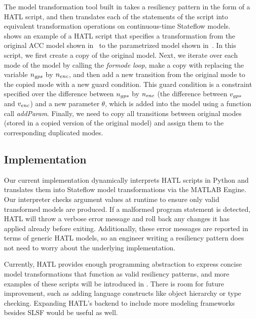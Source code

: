 The model transformation tool built in \toolreaffirm takes a resiliency pattern in the form of a HATL script, and then translates each of the statements of the script into equivalent transformation operations on continuous-time Stateflow models.
%
~ shows an example of a HATL script that specifies a transformation from the original ACC model shown in~ to the parametrized model shown in~.
In this script, we first create a copy of the original model. Next, we iterate over each mode of the model by calling the \emph{formode loop}, make a copy with replacing the variable $n_{gps}$ by $n_{enc}$, and then add a new transition from the original mode to the copied mode with a new guard condition. This guard condition is a constraint specified over the difference between $n_{gps}$ by $n_{enc}$ (\ie the difference between $v_{gps}$ and $v_{enc}$)  and a new parameter $\theta$, which is added into the model using a function call \emph{addParam}.
Finally, we need to copy all transitions between original modes (stored in a copied version of the original model) and assign them to the corresponding duplicated modes.

%
\vspace{-0.5em}%
\subsection{Implementation}
%
Our current implementation dynamically interprets HATL scripts in
Python and translates them into Stateflow model transformations via
the MATLAB Engine. Our interpreter checks argument values at runtime
to ensure only valid transformed models are produced. If a malformed
program statement is detected, HATL will throw a verbose error message
and roll back any changes it has applied already before
exiting. Additionally, these error messages are reported in terms of
generic HATL models, so an engineer writing a resiliency pattern does
not need to worry about the underlying implementation.

Currently, HATL provides enough programming abstraction to express concise model transformations that function as valid resiliency patterns, and more examples of these scripts will be introduced in . There is room for future improvement, such as adding language constructs like object hierarchy or type checking. Expanding HATL's backend to include more modeling frameworks besides SLSF would be useful as well.











